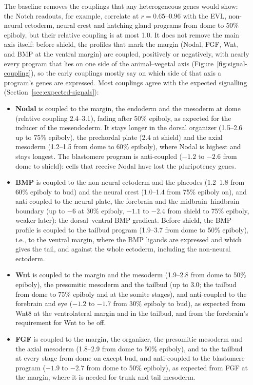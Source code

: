 \documentclass[11pt,a4paper]{article}
\begin{document}
The baseline removes the couplings that any heterogeneous genes would show: the Notch readouts, for example, correlate at $r = 0.65$--$0.96$ with the EVL, non-neural ectoderm, neural crest and hatching gland programs from dome to 50\% epiboly, but their relative coupling is at most 1.0. It does not remove the main axis itself: before shield, the profiles that mark the margin (Nodal, FGF, Wnt, and BMP at the ventral margin) are coupled, positively or negatively, with nearly every program that lies on one side of the animal--vegetal axis (Figure~\ref{fig:signal-coupling}), so the early couplings mostly say on which side of that axis a program's genes are expressed. Most couplings agree with the expected signalling (Section~\ref{sec:expected-signals}):
\begin{itemize}
	\item \textbf{Nodal} is coupled to the margin, the endoderm and the mesoderm at dome (relative coupling 2.4--3.1), fading after 50\% epiboly, as expected for the inducer of the mesendoderm. It stays longer in the dorsal organizer (1.5--2.6 up to 75\% epiboly), the prechordal plate (2.4 at shield) and the axial mesoderm (1.2--1.5 from dome to 60\% epiboly), where Nodal is highest and stays longest. The blastomere program is anti-coupled ($-1.2$ to $-2.6$ from dome to shield): cells that receive Nodal have lost the pluripotency genes.
	\item \textbf{BMP} is coupled to the non-neural ectoderm and the placodes (1.2--1.8 from 60\% epiboly to bud) and the neural crest (1.0--1.4 from 75\% epiboly on), and anti-coupled to the neural plate, the forebrain and the midbrain--hindbrain boundary (up to $-6$ at 30\% epiboly, $-1.1$ to $-2.4$ from shield to 75\% epiboly, weaker later): the dorsal--ventral BMP gradient. Before shield, the BMP profile is coupled to the tailbud program (1.9--3.7 from dome to 50\% epiboly), i.e., to the ventral margin, where the BMP ligands are expressed and which gives the tail, and against the whole ectoderm, including the non-neural ectoderm.
	\item \textbf{Wnt} is coupled to the margin and the mesoderm (1.9--2.8 from dome to 50\% epiboly), the presomitic mesoderm and the tailbud (up to 3.0; the tailbud from dome to 75\% epiboly and at the somite stages), and anti-coupled to the forebrain and eye ($-1.2$ to $-1.7$ from 30\% epiboly to bud), as expected from Wnt8 at the ventrolateral margin and in the tailbud, and from the forebrain's requirement for Wnt to be off.
	\item \textbf{FGF} is coupled to the margin, the organizer, the presomitic mesoderm and the axial mesoderm (1.8--2.9 from dome to 50\% epiboly), and to the tailbud at every stage from dome on except bud, and anti-coupled to the blastomere program ($-1.9$ to $-2.7$ from dome to 50\% epiboly), as expected from FGF at the margin, where it is needed for trunk and tail mesoderm.

\end{itemize}
\end{document}
